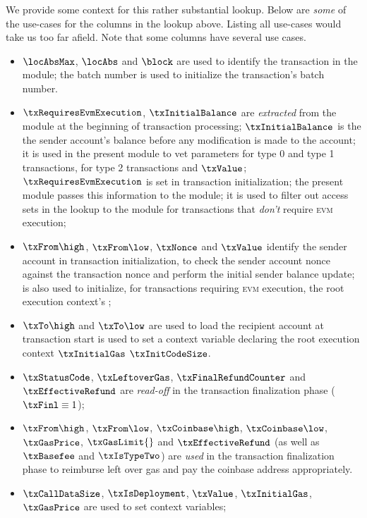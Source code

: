 \noindent We provide some context for this rather substantial lookup. Below are \emph{some} of the use-cases for the columns in the lookup above. Listing all use-cases would take us too far afield. Note that some columns have several use cases.
\begin{itemize}
	\item 
		$\locAbsMax$,
		$\locAbs$ and $\block$
		are used to identify the transaction in the \hubMod{} module; the batch number is used to initialize the transaction's batch number.
	\item 
		$\txRequiresEvmExecution$, $\txInitialBalance$ are \emph{extracted} from the \hubMod{} module at the beginning of transaction processing;
		$\txInitialBalance$ is the the sender account's balance before any modification is made to the account; it is used in the present module to vet  parameters for type 0 and type 1 transactions,  for type 2 transactions and $\txValue$;
		$\txRequiresEvmExecution$ is set in transaction initialization; the present module passes this information to the \rlpTxnMod{} module; it is used to filter out access sets in the lookup to the \hubMod{} module for transactions that \emph{don't} require \textsc{evm} execution; 
	\item
		$\txFrom\high$, $\txFrom\low$,
		$\txNonce$ and $\txValue$
		identify the sender account in transaction initialization, to check the sender account nonce \accNonce{} against the transaction nonce \txNonce{} and perform the initial sender balance update;  is also used to initialize, for transactions requiring \textsc{evm} execution, the root execution context's \cnCallValue{};
	\item
		$\txTo\high$ and $\txTo\low$ are used to load the recipient account at transaction start
		 is used to set a context variable declaring the root execution context 
		$\txInitialGas$
		$\txInitCodeSize$.
	\item 
		$\txStatusCode$,
		$\txLeftoverGas$,
		$\txFinalRefundCounter$ and
		$\txEffectiveRefund$ are \emph{read-off} in the transaction finalization phase ($\txFinl \equiv 1$);
	\item 
		$\txFrom\high$, $\txFrom\low$,
		$\txCoinbase\high$, $\txCoinbase\low$,
		$\txGasPrice$, 
		$\txGasLimit{}$ and
		$\txEffectiveRefund$
		(as well as $\txBasefee$ and $\txIsTypeTwo$) are \emph{used} in the transaction finalization phase to reimburse left over gas and pay the coinbase address appropriately.
	\item
		$\txCallDataSize$, $\txIsDeployment$, $\txValue$, $\txInitialGas$, $\txGasPrice$ are used to set context variables;
\end{itemize}

